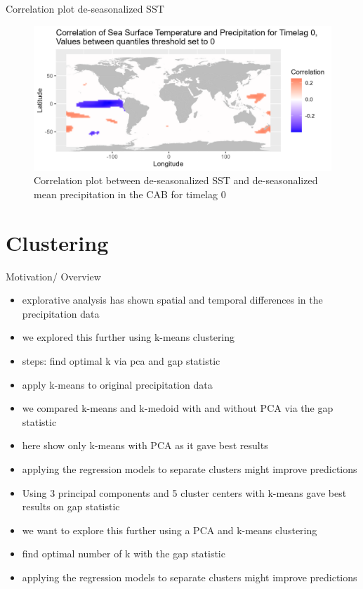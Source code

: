 \documentclass[
  ignorenonframetext,
]{beamer}
\begin{document}
\begin{frame}{Correlation plot de-seasonalized SST}
\protect\hypertarget{correlation-plot-de-seasonalized-sst-1}{}
\begin{figure}

{\centering \includegraphics[width=0.65\linewidth,height=0.65\textheight]{../pres-plots/des-data/q-corr-0} 

}

\caption{Correlation plot between de-seasonalized SST and de-seasonalized mean precipitation in the CAB for timelag 0}\label{fig:des-corr-0q}
\end{figure}
\end{frame}

\hypertarget{clustering}{%
\section{Clustering}\label{clustering}}

\begin{frame}{Motivation/ Overview}
\protect\hypertarget{motivation-overview}{}
\begin{itemize}
\item
  explorative analysis has shown spatial and temporal differences in the
  precipitation data
\item
  we explored this further using k-means clustering
\item
  steps: find optimal k via pca and gap statistic
\item
  apply k-means to original precipitation data
\item
  we compared k-means and k-medoid with and without PCA via the gap
  statistic
\item
  here show only k-means with PCA as it gave best results
\item
  applying the regression models to separate clusters might improve
  predictions
\item
  Using 3 principal components and 5 cluster centers with k-means gave
  best results on gap statistic
\item
  we want to explore this further using a PCA and k-means clustering
\item
  find optimal number of k with the gap statistic
\item
  applying the regression models to separate clusters might improve
  predictions
\end{itemize}
\end{frame}
\end{document}
